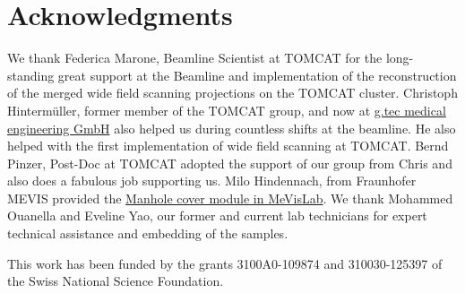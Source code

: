 \documentclass[%
	paper=a4,%
	abstract=true,%
	]{scrartcl}
\begin{document}
\section{Acknowledgments}
We thank Federica Marone, Beamline Scientist at TOMCAT for the long-standing great support at the Beamline and implementation of the reconstruction of the merged wide field scanning projections on the TOMCAT cluster. Christoph Hinterm\"{u}ller, former member of the TOMCAT group, and now at \href{http://gtec.at/}{g.tec medical engineering GmbH} also helped us during countless shifts at the beamline. He also helped with the first implementation of wide field scanning at TOMCAT. Bernd Pinzer, Post-Doc at TOMCAT adopted the support of our group from Chris and also does a fabulous job supporting us. Milo Hindennach, from Fraunhofer MEVIS provided the \href{http://www.mevis-research.de/cgi-bin/discus/board-auth.cgi?lm=1282233250&file=/839/11760.html}{Manhole cover module in MeVisLab}.  We thank Mohammed Ouanella and Eveline Yao, our former and current lab technicians for expert technical assistance and embedding of the samples.

This work has been funded by the grants 3100A0-109874 and 310030-125397 of the Swiss National Science Foundation.

\singlespacing


\end{document}
